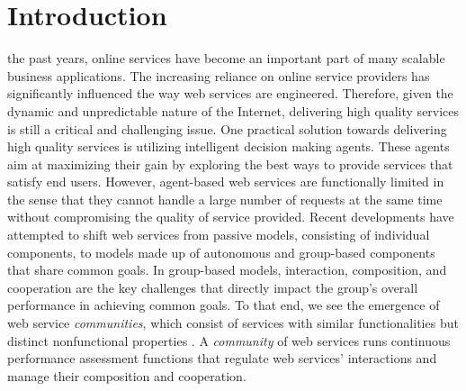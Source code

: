 \documentclass[10pt,journal,cspaper,compsoc]{IEEEtran}
\begin{document}
\maketitle


\IEEEdisplaynotcompsoctitleabstractindextext


%
\IEEEpeerreviewmaketitle


\section{Introduction}

 the past years, online services have become an important part of many scalable business applications. The increasing reliance on online service providers has significantly influenced the way web services are engineered. Therefore, given the dynamic and unpredictable nature of the Internet, delivering high quality services is still a critical and challenging issue. One practical solution towards delivering high quality services is utilizing intelligent decision making agents. These agents aim at maximizing their gain by exploring the best ways to provide services that satisfy end users\cite{Zeng:2003:QDW:775152.775211, 10.1109/ARES.2008.7, journals/tsc/ZhengZYB13}. However, agent-based web services are functionally limited in the sense that they cannot handle a large number of requests at the same time without compromising the quality of service provided. Recent developments have attempted to shift web services from passive models, consisting of individual components, to models made up of autonomous and group-based components that share common goals. In group-based models, interaction, composition, and cooperation are the key challenges \cite{ICWS2011-1, SCC2011-1, journals/mags/BaldoniBM10, journals/jcss/CasadoYT13} that directly impact the group's overall performance in achieving common goals. To that end, we see the emergence of web service \emph{communities}, which consist of services with similar functionalities but distinct nonfunctional properties \cite{Zeng:2003:QDW:775152.775211, Paik:2005:TSS:2229263.2230038, Medjahed05adynamic, 10.1109/ARES.2008.7}. A \emph{community} of web services runs continuous performance assessment functions that regulate web services' interactions and manage their composition and cooperation.
\end{document}
